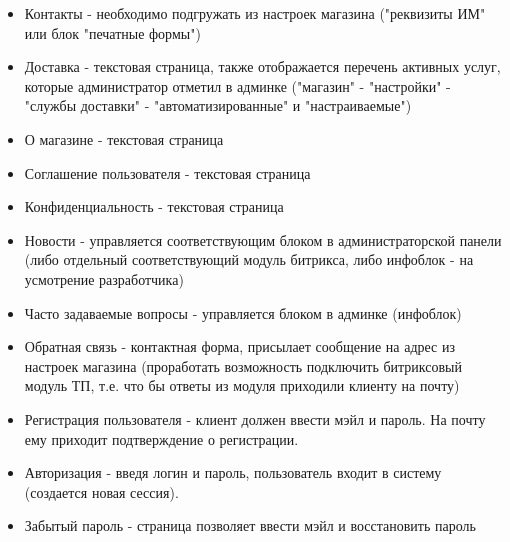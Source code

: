 \documentclass[DIV=calc, paper=a4, fontsize=11pt]{scrartcl} %
\begin{document}
\begin{itemize}
	\item Контакты - необходимо подгружать из настроек магазина ("реквизиты ИМ" или блок "печатные формы")
	\item Доставка - текстовая страница, также отображается перечень активных услуг, которые администратор отметил в админке ("магазин" - "настройки" - "службы доставки" - "автоматизированные" и "настраиваемые")
	\item О магазине - текстовая страница
	\item Соглашение пользователя - текстовая страница
	\item Конфиденциальность - текстовая страница
	\item Новости - управляется соответствующим блоком в администраторской панели (либо отдельный соответствующий модуль битрикса, либо инфоблок - на усмотрение разработчика)
	\item Часто задаваемые вопросы - управляется блоком в админке (инфоблок)
	\item Обратная связь - контактная форма, присылает сообщение на адрес из настроек магазина (проработать возможность подключить битриксовый модуль ТП, т.е. что бы ответы из модуля приходили клиенту на почту)
	\item Регистрация пользователя - клиент должен ввести мэйл и пароль. На почту ему приходит подтверждение о регистрации.
	\item Авторизация - введя логин и пароль, пользователь входит в систему (создается новая сессия).
	\item Забытый пароль - страница позволяет ввести мэйл и восстановить пароль
\end{itemize}
\end{document}
